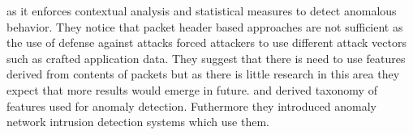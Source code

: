 as it enforces contextual analysis and statistical measures to detect anomalous behavior. They notice that
packet header based approaches are not sufficient as the use of defense against attacks forced attackers 
to use different attack vectors such as crafted application data. They suggest that there is need to use 
features derived from contents of packets but as there is little research in this area they expect that
more results would emerge in future.
%
 and  \cite{onut2007feature} derived taxonomy of features used for anomaly detection.
Futhermore they introduced anomaly network intrusion detection systems which use them.
%
%
